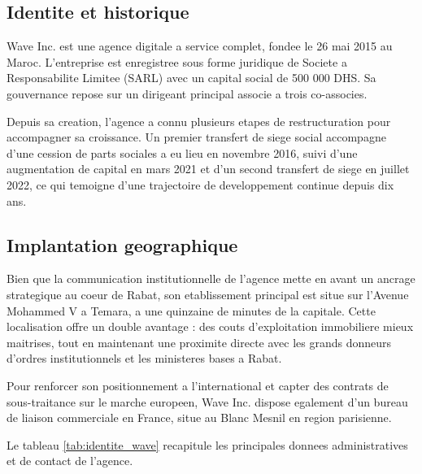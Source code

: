 \documentclass[12pt, a4paper]{report}
\begin{document}
\subsection{Identite et historique}

Wave Inc. est une agence digitale a service complet, fondee le 26 mai 2015 au
Maroc. L'entreprise est enregistree sous forme juridique de Societe a
Responsabilite Limitee (SARL) avec un capital social de 500 000 DHS. Sa
gouvernance repose sur un dirigeant principal associe a trois co-associes.

Depuis sa creation, l'agence a connu plusieurs etapes de restructuration pour
accompagner sa croissance. Un premier transfert de siege social accompagne d'une
cession de parts sociales a eu lieu en novembre 2016, suivi d'une augmentation
de capital en mars 2021 et d'un second transfert de siege en juillet 2022, ce
qui temoigne d'une trajectoire de developpement continue depuis dix ans.

\subsection{Implantation geographique}

Bien que la communication institutionnelle de l'agence mette en avant un ancrage
strategique au coeur de Rabat, son etablissement principal est situe sur
l'Avenue Mohammed V a Temara, a une quinzaine de minutes de la capitale. Cette
localisation offre un double avantage : des couts d'exploitation immobiliere
mieux maitrises, tout en maintenant une proximite directe avec les grands
donneurs d'ordres institutionnels et les ministeres bases a Rabat.

Pour renforcer son positionnement a l'international et capter des contrats de
sous-traitance sur le marche europeen, Wave Inc. dispose egalement d'un bureau
de liaison commerciale en France, situe au Blanc Mesnil en region parisienne.

Le tableau \ref{tab:identite_wave} recapitule les principales donnees
administratives et de contact de l'agence.
\end{document}
